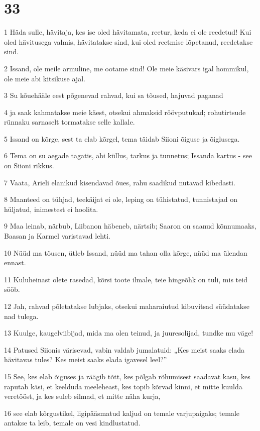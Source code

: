 \chapter{33}

\par 1 Häda sulle, hävitaja, kes ise oled hävitamata, reetur, keda ei ole reedetud! Kui oled hävitusega valmis, hävitatakse sind, kui oled reetmise lõpetanud, reedetakse sind.
\par 2 Issand, ole meile armuline, me ootame sind! Ole meie käsivars igal hommikul, ole meie abi kitsikuse ajal.
\par 3 Su kõuehääle eest põgenevad rahvad, kui sa tõused, hajuvad paganad
\par 4 ja saak kahmatakse meie käest, otsekui ahmaksid röövputukad; rohutirtsude rünnaku sarnaselt tormatakse selle kallale.
\par 5 Issand on kõrge, sest ta elab kõrgel, tema täidab Siioni õiguse ja õiglusega.
\par 6 Tema on su aegade tagatis, abi küllus, tarkus ja tunnetus; Issanda kartus - see on Siioni rikkus.
\par 7 Vaata, Arieli elanikud kisendavad õues, rahu saadikud nutavad kibedasti.
\par 8 Maanteed on tühjad, teekäijat ei ole, leping on tühistatud, tunnistajad on hüljatud, inimestest ei hoolita.
\par 9 Maa leinab, närbub, Liibanon häbeneb, närtsib; Saaron on saanud kõnnumaaks, Baasan ja Karmel varistavad lehti.
\par 10 Nüüd ma tõusen, ütleb Issand, nüüd ma tahan olla kõrge, nüüd ma ülendan ennast.
\par 11 Kuluheinast olete rasedad, kõrsi toote ilmale, teie hingeõhk on tuli, mis teid sööb.
\par 12 Jah, rahvad põletatakse lubjaks, otsekui maharaiutud kibuvitsad süüdatakse nad tulega.
\par 13 Kuulge, kaugelviibijad, mida ma olen teinud, ja juuresolijad, tundke mu väge!
\par 14 Patused Siionis värisevad, vabin valdab jumalatuid: „Kes meist saaks elada hävitavas tules? Kes meist saaks elada igavesel leel?”
\par 15 See, kes elab õiguses ja räägib tõtt, kes põlgab rõhumisest saadavat kasu, kes raputab käsi, et keelduda meeleheast, kes topib kõrvad kinni, et mitte kuulda veretööst, ja kes suleb silmad, et mitte näha kurja,
\par 16 see elab kõrgustikel, ligipääsmatud kaljud on temale varjupaigaks; temale antakse ta leib, temale on vesi kindlustatud.
